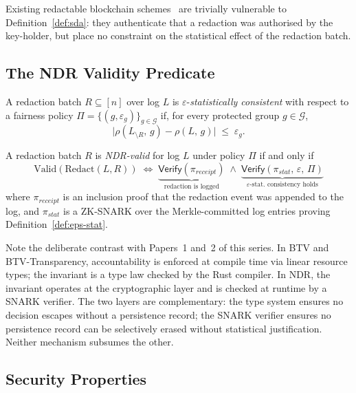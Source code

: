 \noindent Existing redactable blockchain schemes~\cite{ateniese2017,deuber2019}
are trivially vulnerable to Definition~\ref{def:sda}: they authenticate
that a redaction was authorised by the key-holder, but place no constraint
on the statistical effect of the redaction batch.

\subsection{The NDR Validity Predicate}

\begin{definition}
\label{def:eps-stat}
A redaction batch $R \subseteq [n]$ over log $L$ is
$\varepsilon$-\emph{statistically consistent} with respect to a fairness
policy $\Pi = \{(g, \varepsilon_g)\}_{g \in \mathcal{G}}$ if, for every
protected group $g \in \mathcal{G}$,
\[
  \bigl|\rho(L_{\setminus R},\, g) - \rho(L,\, g)\bigr| \;\leq\; \varepsilon_g.
\]
\end{definition}

\begin{definition}
\label{def:valid-redaction}
A redaction batch $R$ is \emph{NDR-valid} for log $L$ under policy $\Pi$
if and only if
\[
  \text{Valid}(\text{Redact}(L, R)) \;\iff\;
  \underbrace{\mathsf{Verify}(\pi_{\mathit{receipt}})}_{
    \text{redaction is logged}}
  \;\land\;
  \underbrace{\mathsf{Verify}(\pi_{\mathit{stat}},\, \varepsilon,\, \Pi)}_{
    \text{$\varepsilon$-stat.~consistency holds}}
\]
where $\pi_{\mathit{receipt}}$ is an inclusion proof that the redaction
event was appended to the log, and $\pi_{\mathit{stat}}$ is a ZK-SNARK
over the Merkle-committed log entries proving Definition~\ref{def:eps-stat}.
\end{definition}

\noindent Note the deliberate contrast with Papers~1 and~2 of this series.
In BTV and BTV-Transparency, accountability is enforced at compile time via
linear resource types; the invariant is a type law checked by the Rust
compiler. In NDR, the invariant operates at the cryptographic layer and is
checked at runtime by a SNARK verifier. The two layers are
complementary: the type system ensures no decision escapes without a
persistence record; the SNARK verifier ensures no persistence record can
be selectively erased without statistical justification. Neither mechanism
subsumes the other.

\subsection{Security Properties}

